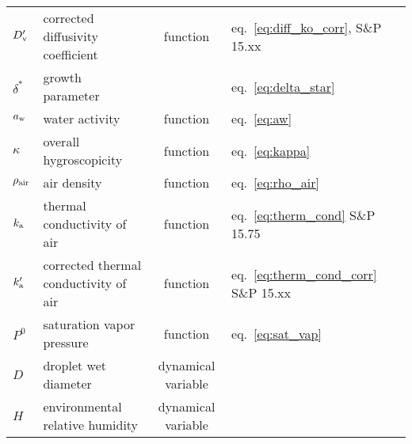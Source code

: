\documentclass{article}
\begin{document}
\begin{tabular}{lp{4cm}clp{3cm}}
$D_{\rm v}'$     & corrected diffusivity coefficient   &  function & eq.~\ref{eq:diff_ko_corr}, S\&P 15.xx  \\
$\delta^*$  & growth parameter &  & eq.~\ref{eq:delta_star}\\
$a_{\rm w}$  & water activity  & function & eq.~\ref{eq:aw}   \\
$\kappa$      &  overall hygroscopicity   &  function &  eq.~\ref{eq:kappa}  \\
$ \rho_{\rm air}$    &  air density   &  function &  eq.~\ref{eq:rho_air}  \\
$k_{\rm a} $     & thermal conductivity of air    &  function&  eq.~\ref{eq:therm_cond} S\&P 15.75   \\
$k_{\rm a}' $    & corrected thermal conductivity of air    &  function &  eq.~\ref{eq:therm_cond_corr} S\&P 15.xx   \\
$P^0$   & saturation vapor pressure &  function & eq.~\ref{eq:sat_vap}  \\
$D$     &  droplet wet diameter  & dynamical variable  &     \\
$H$     &  environmental relative humidity  &  dynamical variable &  \\

\hline 
\end{tabular}
\end{document}
